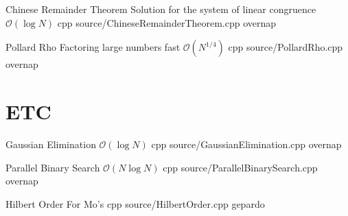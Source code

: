 \documentclass[landscape, 10pt, a4paper, oneside, twocolumn]{extarticle}
\begin{document}
\Algorithm
{Chinese Remainder Theorem}
{Solution for the system of linear congruence}
{$\mathcal{O}(\log{N})$}
{cpp}
{source/ChineseRemainderTheorem.cpp}
{overnap}

\Algorithm
{Pollard Rho}
{Factoring large numbers fast}
{$\mathcal{O}(N^{1/4})$}
{cpp}
{source/PollardRho.cpp}
{overnap}


\section{ETC}

\Algorithm
{Gaussian Elimination}
{}
{$\mathcal{O}(\log{N})$}
{cpp}
{source/GaussianElimination.cpp}
{overnap}

\Algorithm
{Parallel Binary Search}
{}
{$\mathcal{O}(N\log{N})$}
{cpp}
{source/ParallelBinarySearch.cpp}
{overnap}

\Algorithm
{Hilbert Order}
{For Mo's}
{}
{cpp}
{source/HilbertOrder.cpp}
{gepardo}



\end{document}

